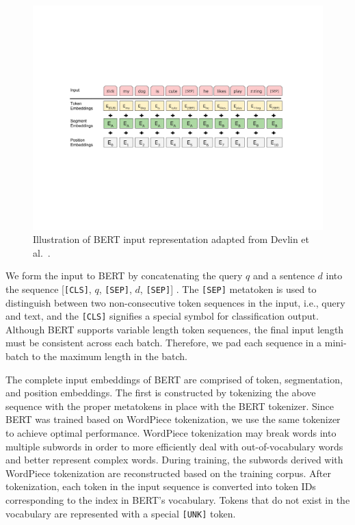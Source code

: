 
\begin{figure}[t!]
\centering
  \includegraphics[width=6.5in]{figures/input.pdf}
\caption{Illustration of BERT input representation adapted from Devlin et al.~\cite{devlin2018bert}.}
\label{fig:bert_input}
\end{figure}

We form the input to BERT by concatenating the query $ q $ and a sentence $ d $ into the sequence [\texttt{[CLS]}, $q$, \texttt{[SEP]}, $d$, \texttt{[SEP]}] .
The \texttt{[SEP]} metatoken is used to distinguish between two non-consecutive token sequences in the input, i.e., query and text, and the \texttt{[CLS]} signifies a special symbol for classification output.
Although BERT supports variable length token sequences, the final input length must be consistent across each batch.
Therefore, we pad each sequence in a mini-batch to the maximum length in the batch.

The complete input embeddings of BERT are comprised of token, segmentation, and position embeddings.
The first is constructed by tokenizing the above sequence with the proper metatokens in place with the BERT tokenizer.
Since BERT was trained based on WordPiece tokenization, we use the same tokenizer to achieve optimal performance.
WordPiece tokenization may break words into multiple subwords in order to more efficiently deal with out-of-vocabulary words and better represent complex words.
During training, the subwords derived with WordPiece tokenization are reconstructed based on the training corpus.
After tokenization, each token in the input sequence is converted into token IDs corresponding to the index in BERT's vocabulary.
Tokens that do not exist in the vocabulary are represented with a special \texttt{[UNK]} token.


